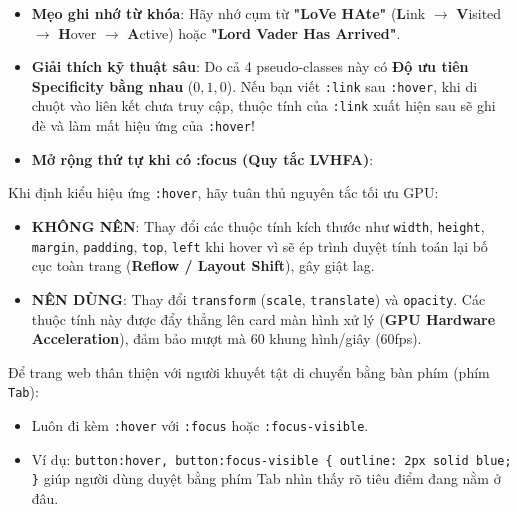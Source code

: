 \documentclass[11pt,oneside]{book}
\newcommand{\codeinline}[1]{\textcolor{accentOrange}{\texttt{#1}}}
\newcommand{\term}[1]{\textbf{\textcolor{primaryBlue}{#1}}}
\begin{document}
\begin{tipBox}
\begin{itemize}[leftmargin=1.5em, itemsep=3pt, parsep=0pt]
    \item \textbf{Mẹo ghi nhớ từ khóa}: Hãy nhớ cụm từ \textbf{"LoVe HAte"} (\textbf{L}ink $\rightarrow$ \textbf{V}isited $\rightarrow$ \textbf{H}over $\rightarrow$ \textbf{A}ctive) hoặc \textbf{"Lord Vader Has Arrived"}.
    \item \textbf{Giải thích kỹ thuật sâu}: Do cả 4 pseudo-classes này có \textbf{Độ ưu tiên Specificity bằng nhau} ($0,1,0$). Nếu bạn viết \codeinline{:link} sau \codeinline{:hover}, khi di chuột vào liên kết chưa truy cập, thuộc tính của \codeinline{:link} xuất hiện sau sẽ ghi đè và làm mất hiệu ứng của \codeinline{:hover}!
    \item \textbf{Mở rộng thứ tự khi có :focus (Quy tắc LVHFA)}:
    \par\vspace{3pt}
\end{itemize}
\end{tipBox}

\begin{warnBox}
Khi định kiểu hiệu ứng \codeinline{:hover}, hãy tuân thủ nguyên tắc tối ưu GPU:
\begin{itemize}[leftmargin=1.5em, itemsep=2pt, parsep=0pt]
    \item \textbf{KHÔNG NÊN}: Thay đổi các thuộc tính kích thước như \codeinline{width}, \codeinline{height}, \codeinline{margin}, \codeinline{padding}, \codeinline{top}, \codeinline{left} khi hover vì sẽ ép trình duyệt tính toán lại bố cục toàn trang (\term{Reflow / Layout Shift}), gây giật lag.
    \item \textbf{NÊN DÙNG}: Thay đổi \codeinline{transform} (\codeinline{scale}, \codeinline{translate}) và \codeinline{opacity}. Các thuộc tính này được đẩy thẳng lên card màn hình xử lý (\term{GPU Hardware Acceleration}), đảm bảo mượt mà 60 khung hình/giây (60fps).
\end{itemize}
\end{warnBox}

\begin{tipBox}
Để trang web thân thiện với người khuyết tật di chuyển bằng bàn phím (phím \codeinline{Tab}):
\begin{itemize}[leftmargin=1.5em, itemsep=2pt, parsep=0pt]
    \item Luôn đi kèm \codeinline{:hover} với \codeinline{:focus} hoặc \codeinline{:focus-visible}.
    \item Ví dụ: \codeinline{button:hover, button:focus-visible \{ outline: 2px solid blue; \}} giúp người dùng duyệt bằng phím Tab nhìn thấy rõ tiêu điểm đang nằm ở đâu.
\end{itemize}
\end{tipBox}
\end{document}
